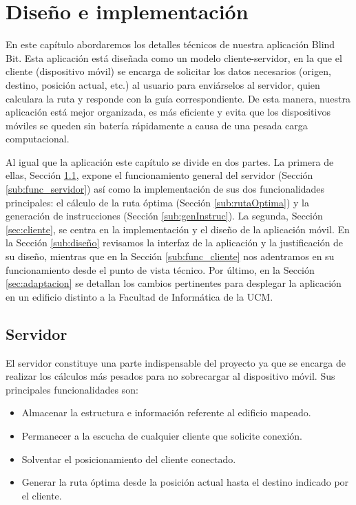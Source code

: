 \chapter{Diseño e implementación}
\label{cap:diseñoeimplementación}


En este capítulo abordaremos los detalles técnicos de nuestra aplicación Blind Bit. Esta aplicación está diseñada como un modelo cliente-servidor, en la que el cliente (dispositivo móvil) se encarga de solicitar los datos necesarios (origen, destino, posición actual, etc.) al usuario para enviárselos al servidor, quien calculara la ruta y responde con la guía correspondiente. De esta manera, nuestra aplicación está mejor organizada, es más eficiente y evita que los dispositivos móviles se queden sin batería rápidamente a causa de una pesada carga computacional.

Al igual que la aplicación este capítulo se divide en dos partes. La primera de ellas, Sección \ref{sec:servidor}, expone el funcionamiento general del servidor (Sección \ref{sub:func_servidor}) así como la implementación de sus dos funcionalidades principales: el cálculo de la ruta óptima (Sección \ref{sub:rutaOptima}) y la generación de instrucciones (Sección \ref{sub:genInstruc}). La segunda, Sección \ref{sec:cliente}, se centra en la implementación y el diseño de la aplicación móvil. En la Sección \ref{sub:diseño} revisamos la interfaz de la aplicación y la justificación de su diseño, mientras que en la Sección \ref{sub:func_cliente} nos adentramos en su funcionamiento desde el punto de vista técnico. Por último, en la Sección \ref{sec:adaptacion} se detallan los cambios pertinentes para desplegar la aplicación en un edificio distinto a la Facultad de Informática de la UCM.



\section{Servidor}
\label{sec:servidor}
El servidor constituye una parte indispensable del proyecto ya que se encarga de realizar los cálculos más pesados para no sobrecargar al dispositivo móvil. Sus principales funcionalidades son:
\begin{itemize}
	\item Almacenar la estructura e información referente al edificio mapeado.
	\item Permanecer a la escucha de cualquier cliente que solicite conexión.
	\item Solventar el posicionamiento del cliente conectado.
	\item Generar la ruta óptima desde la posición actual hasta el destino indicado por el cliente.
\end{itemize} 

